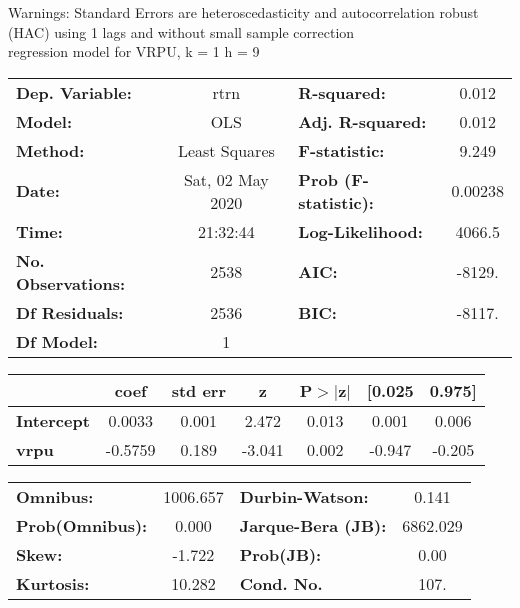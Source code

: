 Warnings: \newline
 [1] Standard Errors are heteroscedasticity and autocorrelation robust (HAC) using 1 lags and without small sample correction\\ 

regression model for VRPU, k = 1 h = 9\begin{center}
\begin{tabular}{lclc}
\toprule
\textbf{Dep. Variable:}    &       rtrn       & \textbf{  R-squared:         } &     0.012   \\
\textbf{Model:}            &       OLS        & \textbf{  Adj. R-squared:    } &     0.012   \\
\textbf{Method:}           &  Least Squares   & \textbf{  F-statistic:       } &     9.249   \\
\textbf{Date:}             & Sat, 02 May 2020 & \textbf{  Prob (F-statistic):} &  0.00238    \\
\textbf{Time:}             &     21:32:44     & \textbf{  Log-Likelihood:    } &    4066.5   \\
\textbf{No. Observations:} &        2538      & \textbf{  AIC:               } &    -8129.   \\
\textbf{Df Residuals:}     &        2536      & \textbf{  BIC:               } &    -8117.   \\
\textbf{Df Model:}         &           1      & \textbf{                     } &             \\
\bottomrule
\end{tabular}
\begin{tabular}{lcccccc}
                   & \textbf{coef} & \textbf{std err} & \textbf{z} & \textbf{P$> |$z$|$} & \textbf{[0.025} & \textbf{0.975]}  \\
\midrule
\textbf{Intercept} &       0.0033  &        0.001     &     2.472  &         0.013        &        0.001    &        0.006     \\
\textbf{vrpu}      &      -0.5759  &        0.189     &    -3.041  &         0.002        &       -0.947    &       -0.205     \\
\bottomrule
\end{tabular}
\begin{tabular}{lclc}
\textbf{Omnibus:}       & 1006.657 & \textbf{  Durbin-Watson:     } &    0.141  \\
\textbf{Prob(Omnibus):} &   0.000  & \textbf{  Jarque-Bera (JB):  } & 6862.029  \\
\textbf{Skew:}          &  -1.722  & \textbf{  Prob(JB):          } &     0.00  \\
\textbf{Kurtosis:}      &  10.282  & \textbf{  Cond. No.          } &     107.  \\
\bottomrule
\end{tabular}
\end{center}


